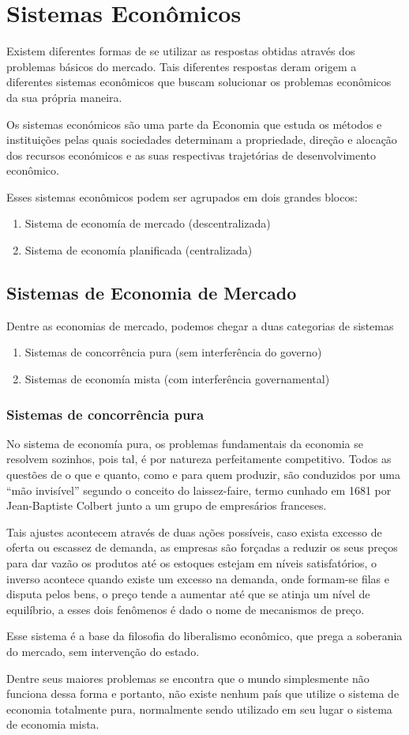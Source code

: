 \section{Sistemas Econômicos}
Existem diferentes formas de se utilizar as respostas obtidas através dos problemas básicos do mercado. Tais diferentes respostas deram origem a diferentes sistemas econômicos que buscam solucionar os problemas econômicos da sua própria maneira.\par
Os sistemas económicos são uma parte da Economia que estuda os métodos e instituições pelas quais sociedades determinam a propriedade, direção e alocação dos recursos económicos e as suas respectivas trajetórias de desenvolvimento econômico.\par
Esses sistemas econômicos podem ser agrupados em dois grandes blocos:\par
\begin{enumerate}
    \item Sistema de economía de mercado (descentralizada)
    \item Sistema de economía planificada (centralizada)
\end{enumerate}
\subsection{Sistemas de Economia de Mercado}
Dentre as economias de mercado, podemos chegar a duas categorias de sistemas
\begin{enumerate}
    \item Sistemas de concorrência pura (sem interferência do governo)
    \item Sistemas de economía mista (com interferência governamental)
\end{enumerate}
\subsubsection{Sistemas de concorrência pura}
No sistema de economía pura, os problemas fundamentais da economia se resolvem sozinhos, pois tal, é por natureza perfeitamente competitivo. Todos as questões de o que e quanto, como e para quem produzir, são conduzidos por uma “mão invisível” segundo o conceito do laissez-faire, termo cunhado em 1681 por Jean-Baptiste Colbert junto a um grupo de empresários franceses.\par
Tais ajustes acontecem através de duas ações possíveis, caso exista excesso de oferta ou escassez de demanda, as empresas são forçadas a reduzir os seus preços para dar vazão os produtos até os estoques estejam em níveis satisfatórios, o inverso acontece quando existe um excesso na demanda, onde formam-se filas e disputa pelos bens, o preço tende a aumentar até que se atinja um nível de equilíbrio, a esses dois fenômenos é dado o nome de mecanismos de preço.\par
Esse sistema é a base da filosofia do liberalismo econômico, que prega a soberania do mercado, sem intervenção do estado.\par
Dentre seus maiores problemas se encontra que o mundo simplesmente não funciona dessa forma e portanto, não existe nenhum país que utilize o sistema de economia totalmente pura, normalmente sendo utilizado em seu lugar o sistema de economia mista.\par
